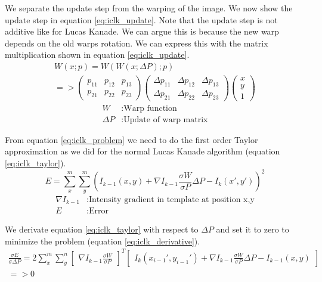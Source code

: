 \documentclass[11pt,a4paper,titlepage,oneside]{report}
\begin{document}
We separate the update step from the warping of the image. We now show the update step in equation \ref{eq:iclk_update}. Note that the update step is not additive like for Lucas Kanade. We can argue this is because the new warp depends on the old warps rotation. We can express this with the matrix multiplication shown in equation \ref{eq:iclk_update}.
\begin{equation}\label{eq:iclk_update}
  \begin{gathered}
    W(x;p)=W(W(x;\Delta P); p)\\
    =>
    \begin{pmatrix}
    p_{11} & p_{12} & p_{13} \\
    p_{21} & p_{22} & p_{23}
    \end{pmatrix}
    \begin{pmatrix}
      \Delta p_{11} & \Delta p_{12} & \Delta p_{13} \\
      \Delta p_{21} & \Delta p_{22} & \Delta p_{23}
    \end{pmatrix}
    \begin{pmatrix}
      x\\
      y\\
      1
    \end{pmatrix}
  \end{gathered}
\end{equation}
\begin{align*}
  W               &: \text{Warp function}\\
  \Delta P        &: \text{Update of warp matrix}
\end{align*}

From equation \ref{eq:iclk_problem} we need to do the first order Taylor approximation as we did for the normal Lucas Kanade algorithm (equation \ref{eq:iclk_taylor}).
\begin{equation}\label{eq:iclk_taylor}
  E=\sum_x^m\sum_y^m(I_{k-1}(x,y)+\nabla I_{k-1}\frac{\sigma W}{\sigma P}\Delta P-I_{k}(x',y'))^2
\end{equation}
\begin{align*}
  \nabla I_{k-1}  &: \text{Intensity gradient in template at position x,y}\\
  E               &: \text{Error}
\end{align*}

We derivate equation \ref{eq:iclk_taylor} with respect to $\Delta P$ and set it to zero to minimize the problem (equation \ref{eq:iclk_derivative}).
\begin{equation}\label{eq:iclk_derivative}
  \begin{gathered}
  \frac{\sigma E}{\sigma \Delta P}=2\sum_x^m\sum_y^n\begin{bmatrix}\nabla I_{k-1}\frac{\sigma W}{\sigma P}\end{bmatrix}^T\begin{bmatrix}I_{k}(x_{i-1}',y_{i-1}')+\nabla I_{k-1}\frac{\sigma W}{\sigma P}\Delta P-I_{k-1}(x,y)\end{bmatrix}\\
  =>0
  \end{gathered}
\end{equation}
\end{document}
